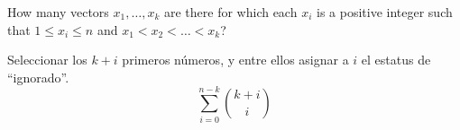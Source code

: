 \item How many vectors $x_1, \dots, x_k$ are there for which each $x_i$ is a positive integer such that $1 \le x_i \le n$ and $x_1 < x_2 < \dots < x_k$?

Seleccionar los $k+i$ primeros números, y entre ellos asignar a $i$ el estatus de \enquote{ignorado}.
\[ \sum_{i=0}^{n-k} \binom{k+i}{i} \]
